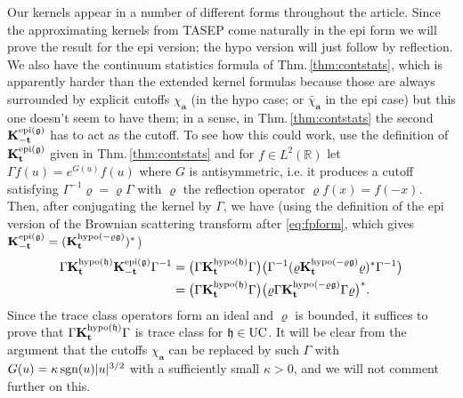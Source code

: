 \documentclass[letterpaper,reqno,11pt,oneside,final]{amsart}
\theoremstyle{definition}
\newcommand{\fh}{\mathfrak{h}}
\newcommand{\fg}{\mathfrak{g}}
\newcommand{\rr}{\mathbb{R}}
\newcommand{\uptext}[1]{\text{\upshape{#1}}}
\DeclareMathOperator{\epi}{\uptext{epi}}
\DeclareMathOperator{\hypo}{\uptext{hypo}}
\DeclareMathOperator{\UC}{\uptext{UC}}
\DeclareMathOperator{\sgn}{\uptext{sgn}}
\newcommand{\ft}{\mathbf{t}}
\newcommand{\fa}{\mathbf{a}}
\newcommand{\fK}{\mathbf{K}}
\renewcommand{\P}{\chi}
\numberwithin{equation}{section}
\begin{document}
Our kernels appear in a number of different forms throughout the article.
Since the approximating kernels from TASEP come naturally in the epi form we will prove the result for the epi version; the hypo version will just follow by reflection.
We also have the continuum statistics formula of Thm.\,\ref{thm:contstats}, which is apparently harder than the extended kernel formulas because those are always surrounded by explicit cutoffs $\P_{\fa}$ (in the hypo case; or $\bar\P_\fa$ in the epi case) but this one doesn't seem to have them; in a sense, in Thm.\,\ref{thm:contstats} the second $\fK^{\epi(\fg)}_{-\ft}$ has to act as the cutoff.
To see how this could work, use the definition of $\fK^{\epi(\fg)}_{\ft}$ given in Thm.\,\ref{thm:contstats} and for $f\in L^2(\rr)$ let
$\Gamma f(u)=e^{{G}(u)} f(u)$ where $G$ is antisymmetric, i.e. it produces a cutoff satisfying 
$\Gamma^{-1}\varrho = \varrho\Gamma$ with $\varrho$ the reflection operator $\varrho f(x)=f(-x)$.
Then, after conjugating the kernel by $\Gamma$, we have (using the definition of the epi version of the Brownian scattering transform after \eqref{eq:fpform}, which gives $\fK^{\epi(\fg)}_{-\ft}=(\fK^{\hypo(-\varrho\fg)}_{\ft})^*$)
\begin{equation}\label{eq:magicConjugation}
\begin{split}
\Gamma\fK^{\hypo(\fh)}_{\ft}\fK^{\epi(\fg)}_{-\ft}\Gamma^{-1}&=\big(\Gamma\fK^{\hypo(\fh)}_\ft\Gamma\big)\big(\Gamma^{-1}(\varrho\fK^{\hypo(-\varrho\fg)}_{\ft}\varrho)^*\Gamma^{-1}\big)\\
&=\big(\Gamma\fK^{\hypo(\fh)}_\ft\Gamma\big)\big(\varrho\Gamma\fK^{\hypo(-\varrho\fg)}_{\ft}\Gamma\varrho\big)^*.
\end{split}
\end{equation}
Since the trace class operators form an ideal and $\varrho$ is bounded, it suffices to prove that $\Gamma\fK^{\hypo(\fh)}_{\ft}\Gamma$ is trace class for $\fh\in\UC$.  It will be clear from the argument that the cutoffs  $\P_\fa$ can be replaced by such $\Gamma$ with ${G}(u) = \kappa \sgn(u) |u|^{3/2}$ with a sufficiently small $\kappa>0$, and we will not comment further on this.
  
\end{document}
